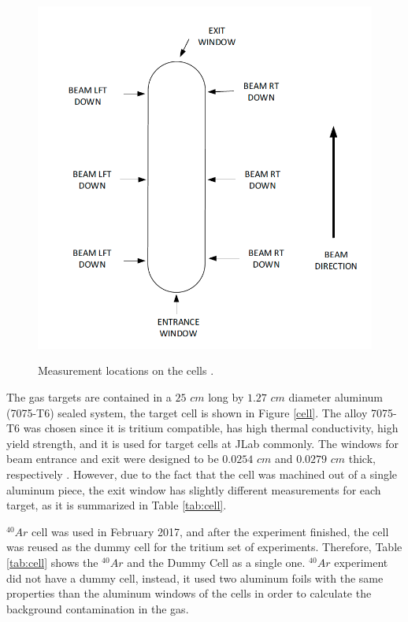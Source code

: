 \documentclass[final,5p,times,twocolumn]{elsarticle}
\begin{document}
\begin{figure}[!h]
\centering
  \includegraphics[width=\linewidth]{images/tgt_measurements.png}\\
  \caption{Measurement locations on the cells \cite{cellconfig}. 
 }\label{fig:cellconfig}
\end{figure}

The gas targets are contained in a $25$ $cm$ long by $1.27$ $cm$ diameter aluminum (7075-T6) sealed system, the target cell is shown in Figure \ref{cell}. The alloy 7075-T6 was chosen since it is tritium compatible, has high thermal conductivity, high yield strength, and it is used for target cells at JLab commonly. The windows for beam entrance and exit were designed to be $0.0254$ $cm$ and $0.0279$ $cm$ thick, respectively \cite{celldes}. However, due to the fact that the cell was machined out of a single aluminum piece, the exit window has slightly different measurements for each target, as it is summarized in Table \ref{tab:cell}.

$^{40}Ar$ cell was used in February 2017, and after the experiment finished, the cell was reused as the dummy cell for the tritium set of experiments. Therefore, Table \ref{tab:cell} shows the $^{40}Ar$ and the Dummy Cell as a single one. $^{40}Ar$ experiment did not have a dummy cell, instead, it used two aluminum foils with the same properties than the aluminum windows of the cells in order to calculate the background contamination in the gas.
\end{document}
